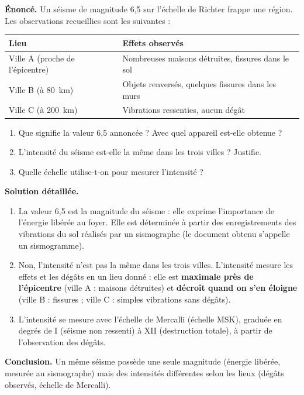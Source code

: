 \documentclass[11pt]{article}
\newcommand{\cle}[1]{{\popxbold\color{popdark}#1}}
\begin{document}
\begin{exoresolu}
\textbf{Énoncé.} Un séisme de magnitude 6,5 sur l'échelle de Richter frappe une région. Les observations recueillies sont les suivantes :
\begin{center}
\begin{tabularx}{\linewidth}{|l|X|}
\hline
\rowcolor{popblueL} \textbf{Lieu} & \textbf{Effets observés} \\
\hline
Ville A (proche de l'épicentre) & Nombreuses maisons détruites, fissures dans le sol \\
\hline
Ville B (à \SI{80}{km}) & Objets renversés, quelques fissures dans les murs \\
\hline
Ville C (à \SI{200}{km}) & Vibrations ressenties, aucun dégât \\
\hline
\end{tabularx}
\end{center}
\begin{enumerate}
\item Que signifie la valeur 6,5 annoncée ? Avec quel appareil est-elle obtenue ?
\item L'intensité du séisme est-elle la même dans les trois villes ? Justifie.
\item Quelle échelle utilise-t-on pour mesurer l'intensité ?
\end{enumerate}
\tcblower
\textbf{Solution détaillée.}
\begin{enumerate}
\item La valeur 6,5 est la \cle{magnitude} du séisme : elle exprime l'importance de l'énergie libérée au foyer. Elle est déterminée à partir des enregistrements des vibrations du sol réalisés par un \cle{sismographe} (le document obtenu s'appelle un \cle{sismogramme}).
\item Non, l'intensité n'est pas la même dans les trois villes. L'\cle{intensité} mesure les effets et les dégâts en un lieu donné : elle est \textbf{maximale près de l'épicentre} (ville A : maisons détruites) et \textbf{décroît quand on s'en éloigne} (ville B : fissures ; ville C : simples vibrations sans dégâts).
\item L'intensité se mesure avec l'\cle{échelle de Mercalli} (échelle MSK), graduée en degrés de I (séisme non ressenti) à XII (destruction totale), à partir de l'observation des dégâts.
\end{enumerate}
\textbf{Conclusion.} Un même séisme possède une seule magnitude (énergie libérée, mesurée au sismographe) mais des intensités différentes selon les lieux (dégâts observés, échelle de Mercalli).
\end{exoresolu}
\end{document}

